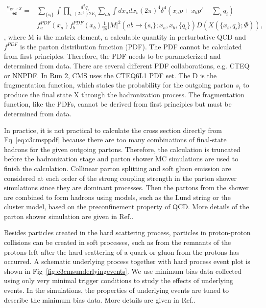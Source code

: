 \begin{equation}
  \begin{split}
		\frac{\sigma_{pp \rightarrow X}}{d\Phi}=& \sum_{\{s_{i}\}} \int \prod_{i} \frac{d^{3}q_{i}}{(2\pi^{3})2E_{i}} \sum_{ab} \int dx_{a}dx_{b}(2\pi)^{4}\delta^{4}(x_{a}p+x_{b}p\prime-\sum_{i}q_{i}) \\
	                                          & f_{a}^{PDF}(x_{a})f_{b}^{PDF}(x_{b}) \frac{1}{2\hat{s}}|M|^{2}(ab \rightarrow \{s_{i}\};x_{a},x_{b},\{q_{i}\}) D(X(\{x_{i},q_{i}\};\Phi)), 
  \end{split}
 \label{eq:c3cmsppdf}
\end{equation}
, where M is the matrix element, a calculable quantity in perturbative QCD and $f^{PDF}$ is the parton distribution function (PDF)\cite{Butterworth:2015oua}. The PDF cannot be calculated from first principles. Therefore, the PDF needs to be parameterized and determined from data. There are several different PDF collaborations, e.g. CTEQ\cite{Lai:2010nw} or NNPDF\cite{Ball:2014uwa}. In Run 2, CMS uses the CTEQ6L1 PDF set. The D is the fragmentation function, which states the probability for the outgoing parton $s_{i}$ to produce the final state X through the hadronization process. The fragmentation function, like the PDFs, cannot be derived from first principles but must be determined from data.

In practice, it is not practical to calculate the cross section directly from Eq~\ref{eq:c3cmsppdf} because there are too many combinations of final-state hadrons for the given outgoing partons. Therefore, the calculation is truncated before the hadronization stage and parton shower MC simulations are used to finish the calculation. Collinear parton splitting and soft gluon emission are considered at each order of the strong coupling strength in the parton shower simulations since they are dominant processes. Then the
partons from the shower are combined to form hadrons using models, such as the Lund string\cite{Andersson:1983ia} or the cluster model, based on the preconfinement property of QCD\cite{Amati:1979fg}. More details of the parton shower simulation are given in Ref.\cite{Hoche:2014rga}.

Besides particles created in the hard scattering process, particles in proton-proton collisions can be created in soft processes, such as from the remnants of the protons left after the hard scattering of a quark or gluon from the protons has occurred. A schematic underlying process together with hard process event plot is shown in Fig~\ref{fig:c3cmsunderlyingevents}. We use minimum bias data collected using only very minimal trigger conditions to study the effects of underlying events. In the simulations, the properties of underlying events are tuned to describe the minimum bias data. More details are given in Ref.\cite{Field:1393621}. 

